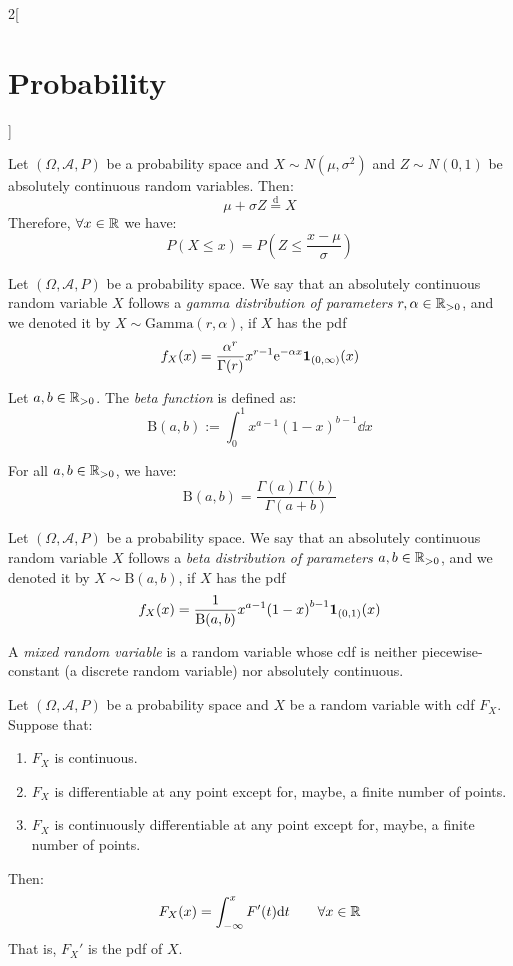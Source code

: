 \documentclass[../../../main.tex]{subfiles}
\begin{document}
\begin{multicols}{2}[\section{Probability}]
\begin{definition}
  \end{definition}
  \begin{prop}
    Let $(\Omega,\mathcal{A},P)$ be a probability space and $X\sim N(\mu,\sigma^2)$ and $Z\sim N(0,1)$ be absolutely continuous random variables. Then: $$\mu+\sigma Z\overset{\text{d}}{=} X$$ Therefore, $\forall x\in\mathbb{R}$ we have: $$P(X\leq x)=P\left(Z\leq\frac{x-\mu}{\sigma}\right)$$
  \end{prop}
  \begin{definition}
    Let $(\Omega,\mathcal{A},P)$ be a probability space. We say that an absolutely continuous random variable $X$ follows a \textit{gamma distribution of parameters $r,\alpha\in\mathbb{R}_{>0}$}, and we denoted it by $X\sim \text{Gamma}(r,\alpha)$, if $X$ has the pdf $$f_X(x)=\frac{\alpha^r}{\Gamma(r)}x^{r-1}\mathrm{e}^{-\alpha x}\boldsymbol{\mathrm{1}}_{(0,\infty)}(x)$$
  \end{definition}
  \begin{definition}
    Let $a,b\in\mathbb{R}_{>0}$. The \textit{beta function} is defined as: $$\text{B}(a,b):=\int_0^1x^{a-1}{(1-x)}^{b-1}\dd x$$
  \end{definition}
  \begin{prop}
    For all $a,b\in\mathbb{R}_{>0}$, we have: $$\text{B}(a,b)=\frac{\Gamma(a)\Gamma(b)}{\Gamma(a+b)}$$
  \end{prop}
  \begin{definition}
    Let $(\Omega,\mathcal{A},P)$ be a probability space. We say that an absolutely continuous random variable $X$ follows a \textit{beta distribution of parameters $a,b\in\mathbb{R}_{>0}$}, and we denoted it by $X\sim \text{B}(a,b)$, if $X$ has the pdf $$f_X(x)=\frac{1}{\text{B}(a,b)}x^{a-1}{(1-x)}^{b-1}\boldsymbol{\mathrm{1}}_{(0,1)}(x)$$
  \end{definition}
  \begin{definition}
    A\textit{ mixed random variable} is a random variable whose cdf is neither piecewise-constant (a discrete random variable) nor absolutely  continuous.
  \end{definition}
  \begin{theorem}
    Let $(\Omega,\mathcal{A},P)$ be a probability space and $X$ be a random variable with cdf $F_X$. Suppose that:
    \begin{enumerate}
      \item $F_X$ is continuous.
      \item $F_X$ is differentiable at any point except for, maybe, a finite number of points.
      \item $F_X$ is continuously differentiable at any point except for, maybe, a finite number of points.
    \end{enumerate}
    Then: $$F_X(x)=\int_{-\infty}^xF'(t)\dd t\qquad\forall x\in\mathbb{R}$$
    That is, ${F_X}'$ is the pdf of $X$.
  \end{theorem}

\end{multicols}
\end{document}
